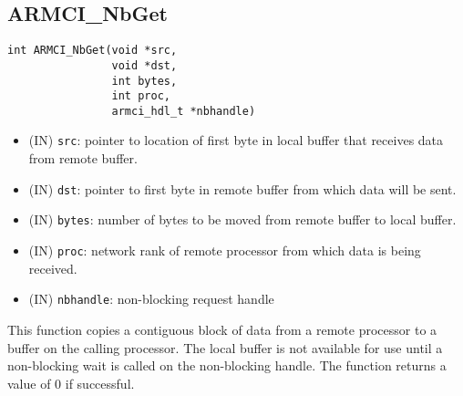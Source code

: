 \documentclass[12pt]{article}
\begin{document}
\subsection{ARMCI\_NbGet}
\begin{verbatim}
int ARMCI_NbGet(void *src,
                void *dst,
                int bytes,
                int proc,
                armci_hdl_t *nbhandle)
\end{verbatim}
\begin{itemize}
\item (IN) \texttt{src}: pointer to location of first byte in local buffer
that receives data from remote buffer.
\item (IN) \texttt{dst}: pointer to first byte in remote buffer from which data
will be sent.
\item (IN) \texttt{bytes}: number of bytes to be moved from remote buffer to
local buffer.
\item (IN) \texttt{proc}: network rank of remote processor from which data is
being received.
\item (IN) \texttt{nbhandle}: non-blocking request handle
\end{itemize}
This function copies a contiguous block of data from a remote processor to a buffer
on the calling processor. The local buffer is not available for use until a
non-blocking wait is called on the non-blocking handle. The function returns a value
of 0 if successful.
\end{document}
